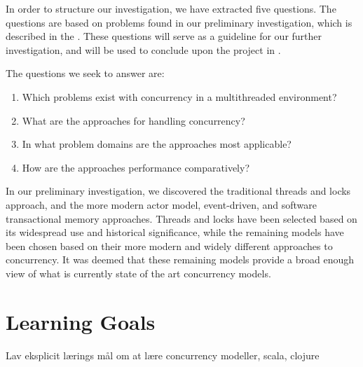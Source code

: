 \makeatletter {}\makeatother
{}
%
In order to structure our investigation, we have extracted five questions. The questions are based on problems found in our preliminary investigation, which is described in the . These questions will serve as a guideline for our further investigation, and will be used to conclude upon the project in .

The questions we seek to answer are:
\begin{enumerate}
\item Which problems exist with concurrency in a multithreaded environment? 
\item What are the approaches for handling concurrency?
\item In what problem domains are the approaches most applicable?
\item How are the approaches performance comparatively?

\end{enumerate}

In our preliminary investigation, we discovered the traditional threads and locks approach, and the more modern actor model, event-driven, and software transactional memory approaches. Threads and locks have been selected based on its widespread use and historical significance, while the remaining models have been chosen based on their more modern and widely different approaches to concurrency. It was deemed that these remaining models provide a broad enough view of what is currently state of the art concurrency models. 

\section{Learning Goals}
Lav eksplicit lærings mål om at lære concurrency modeller, scala, clojure\\

\worksheetend